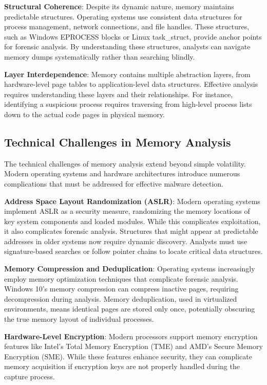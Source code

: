 \textbf{Structural Coherence}: Despite its dynamic nature, memory maintains predictable structures. Operating systems use consistent data structures for process management, network connections, and file handles. These structures, such as Windows EPROCESS blocks or Linux task\_struct, provide anchor points for forensic analysis. By understanding these structures, analysts can navigate memory dumps systematically rather than searching blindly.

\textbf{Layer Interdependence}: Memory contains multiple abstraction layers, from hardware-level page tables to application-level data structures. Effective analysis requires understanding these layers and their relationships. For instance, identifying a suspicious process requires traversing from high-level process lists down to the actual code pages in physical memory.

\subsection{Technical Challenges in Memory Analysis}
\label{subsec:memory_technical_challenges}

The technical challenges of memory analysis extend beyond simple volatility. Modern operating systems and hardware architectures introduce numerous complications that must be addressed for effective malware detection.

\textbf{Address Space Layout Randomization (ASLR)}: Modern operating systems implement ASLR as a security measure, randomizing the memory locations of key system components and loaded modules. While this complicates exploitation, it also complicates forensic analysis. Structures that might appear at predictable addresses in older systems now require dynamic discovery. Analysts must use signature-based searches or follow pointer chains to locate critical data structures.

\textbf{Memory Compression and Deduplication}: Operating systems increasingly employ memory optimization techniques that complicate forensic analysis. Windows 10's memory compression can compress inactive pages, requiring decompression during analysis. Memory deduplication, used in virtualized environments, means identical pages are stored only once, potentially obscuring the true memory layout of individual processes.

\textbf{Hardware-Level Encryption}: Modern processors support memory encryption features like Intel's Total Memory Encryption (TME) and AMD's Secure Memory Encryption (SME). While these features enhance security, they can complicate memory acquisition if encryption keys are not properly handled during the capture process.

